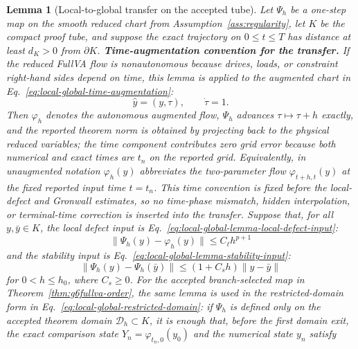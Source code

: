 \documentclass[preprint,12pt]{elsarticle}
\newtheorem{lemma}{Lemma}
\begin{document}
\begin{lemma}[Local-to-global transfer on the accepted tube]
\label{lem:local-global-transfer}
Let $\Psi_h$ be a one-step map on the smooth reduced chart from
Assumption~\ref{ass:regularity}, let \(K\) be the compact proof tube, and
suppose the exact trajectory on \(0\le t\le T\) has distance at least
\(d_K>0\) from \(\partial K\).
\noindent\textbf{Time-augmentation convention for the transfer.}
If the reduced FullVA flow is nonautonomous because drives, loads, or
constraint right-hand sides depend on time, this lemma is applied to the
augmented chart in Eq.~\eqref{eq:local-global-time-augmentation}:
\begin{equation}
\label{eq:local-global-time-augmentation}
  \widehat y=(y,\tau),\qquad \dot\tau=1 .
\end{equation}
Then \(\varphi_h\) denotes the autonomous augmented flow, \(\Psi_h\) advances
\(\tau\mapsto\tau+h\) exactly, and the reported theorem norm is obtained by
projecting back to the physical reduced variables; the time component
contributes zero grid error because both numerical and exact times are
\(t_n\) on the reported grid.  Equivalently, in unaugmented notation
\(\varphi_h(y)\) abbreviates the two-parameter flow
\(\varphi_{t+h,t}(y)\) at the fixed reported input time \(t=t_n\).  This
time convention is fixed before the local-defect and Gronwall estimates, so
no time-phase mismatch, hidden interpolation, or terminal-time correction is
inserted into the transfer.
Suppose that, for all \(y,\bar y\in K\), the local defect input is
Eq.~\eqref{eq:local-global-lemma-local-defect-input}:
\begin{equation}
\label{eq:local-global-lemma-local-defect-input}
  \|\Psi_h(y)-\varphi_h(y)\|\le C_\ell h^{p+1}
\end{equation}
and the stability input is Eq.~\eqref{eq:local-global-lemma-stability-input}:
\begin{equation}
\label{eq:local-global-lemma-stability-input}
  \|\Psi_h(y)-\Psi_h(\bar y)\|\le (1+C_s h)\|y-\bar y\|
\end{equation}
for $0<h\le h_0$, where \(C_s\ge0\).
For the accepted branch-selected map in Theorem~\ref{thm:g6fullva-order},
the same lemma is used in the restricted-domain form in
Eq.~\eqref{eq:local-global-restricted-domain}: if
\(\Psi_h\) is defined only on the accepted theorem domain
\(\mathcal D_h\subset K\), it is enough that, before the first domain exit,
the exact comparison state \(Y_n=\varphi_{t_n,0}(y_0)\) and the numerical
state \(y_n\) satisfy
\begin{equation}

\end{equation}
\end{lemma}
\end{document}
